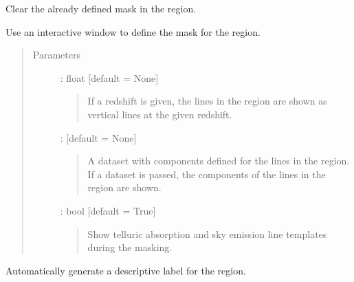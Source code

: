 \documentclass[letterpaper,10pt,english]{sphinxmanual}
\begin{document}
\begin{fulllineitems}
\begin{fulllineitems}
\label{\detokenize{api:regions.Region.clear_mask}}
Clear the already defined mask in the region.

\end{fulllineitems}


\begin{fulllineitems}
\label{\detokenize{api:regions.Region.define_mask}}
Use an interactive window to define the mask for the region.
\begin{quote}\begin{description}
\item[{Parameters}] \leavevmode
{} : float   {[}default = None{]}
\begin{quote}

If a redshift is given, the lines in the region are shown as vertical lines
at the given redshift.
\end{quote}

 : {\hyperref[\detokenize{api:VoigtFit.DataSet}]{}}   {[}default = None{]}
\begin{quote}

A dataset with components defined for the lines in the region.
If a dataset is passed, the components of the lines in the region are shown.
\end{quote}

 : bool   {[}default = True{]}
\begin{quote}

Show telluric absorption and sky emission line templates during the masking.
\end{quote}

\end{description}\end{quote}

\end{fulllineitems}


\begin{fulllineitems}
\label{\detokenize{api:regions.Region.generate_label}}
Automatically generate a descriptive label for the region.


\end{fulllineitems}
\end{fulllineitems}
\end{document}
